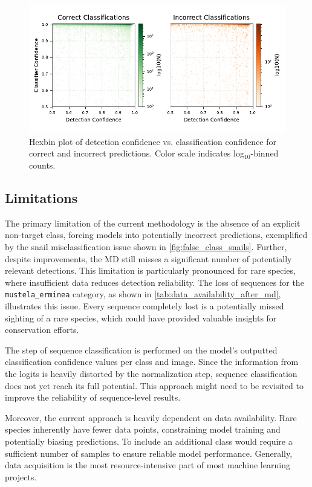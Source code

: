 \begin{figure}[ht]
\centering
\includegraphics{figures/pred_conf_hexbin.pdf}
\caption{Hexbin plot of detection confidence vs. classification confidence for correct and incorrect predictions. Color scale indicates log$_{10}$-binned counts.}
\label{fig:pred_conf_hexbin}
\end{figure}

\subsection{Limitations}
The primary limitation of the current methodology is the absence of an explicit non-target class, forcing models into potentially incorrect predictions, exemplified by the snail misclassification issue shown in \autoref{fig:false_class_snails}.
Further, despite improvements, the \ac{MD} still misses a significant number of potentially relevant detections.
This limitation is particularly pronounced for rare species, where insufficient data reduces detection reliability.
The loss of sequences for the \texttt{mustela\_erminea} category, as shown in \autoref{tab:data_availability_after_md}, illustrates this issue.
Every sequence completely lost is a potentially missed sighting of a rare species, which could have provided valuable insights for conservation efforts.

The step of sequence classification is performed on the model's outputted classification confidence values per class and image.
Since the information from the logits is heavily distorted by the normalization step, sequence classification does not yet reach its full potential.
This approach might need to be revisited to improve the reliability of sequence-level results.

Moreover, the current approach is heavily dependent on data availability.
Rare species inherently have fewer data points, constraining model training and potentially biasing predictions.
To include an additional class would require a sufficient number of samples to ensure reliable model performance.
Generally, data acquisition is the most resource-intensive part of most machine learning projects.

